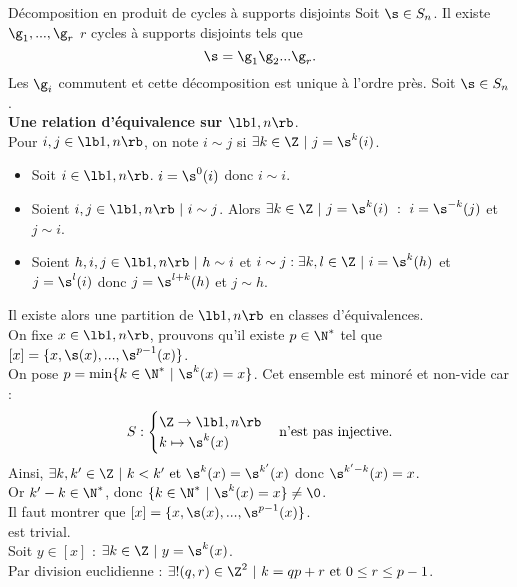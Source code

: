\documentclass[11pt]{article}
\begin{document}
\begin{thm}{Décomposition en produit de cycles à supports disjoints}{}
    Soit $\s\in S_n$. Il existe $\g_1,...,\g_r$ $r$ cycles à supports disjoints tels que
    \begin{equation*}
        \s=\g_1\g_2...\g_r.
    \end{equation*}
    Les $\g_i$ commutent et cette décomposition est unique à l'ordre près.
    \tcblower
    Soit $\s\in S_n$.\\
    \textbf{Une relation d'équivalence sur $\lb1,n\rb$}.\\
    Pour $i,j\in\lb1,n\rb$, on note $i\sim j$ si $\exists k \in \Z ~ | ~ j = \s^k(i)$.
    \begin{itemize}
        \item Soit $i\in\lb1,n\rb$. $i=\s^0(i)$ donc $i \sim i$.
        \item Soient $i,j\in\lb1,n\rb ~ | ~ i \sim j$. Alors $\exists k \in \Z ~ | ~ j = \s^k(i) ~ : ~ i = \s^{-k}(j)$ et $j \sim i$.
        \item Soient $h,i,j\in\lb1,n\rb ~ | ~ h \sim i$ et $i \sim j : \exists k,l \in \Z ~ | ~ i = \s^k(h)$ et $j=\s^l(i)$ donc $j=\s^{l+k}(h)$ et $j \sim h$.
    \end{itemize}
    Il existe alors une partition de $\lb1,n\rb$ en classes d'équivalences.\\
    On fixe $x\in\lb1,n\rb$, prouvons qu'il existe $p\in\N^*$ tel que $[x]=\{x,\s(x),...,\s^{p-1}(x)\}$.\\
    On pose $p=\min\{k\in\N^* ~ | ~ \s^k(x)=x\}$. Cet ensemble est minoré et non-vide car :
    \begin{equation*}
        S : \begin{cases}
            \Z \to \lb1,n\rb\\
            k\mapsto \s^k(x)
        \end{cases}
        \text{n'est pas injective.}
    \end{equation*}
    Ainsi, $\exists k,k' \in \Z ~ | ~ k < k' ~ \text{et} ~ \s^k(x)=\s^{k'}(x)$ donc $\s^{k'-k}(x)=x$.\\
    Or $k'-k\in\N^*$, donc $\{k\in\N^* ~ | ~ \s^k(x)=x\}\neq\0$.\\
    Il faut montrer que $[x]=\{x,\s(x),...,\s^{p-1}(x)\}$.\\
    \fbox{$\supset$} est trivial.\\
    \fbox{$\subset$} Soit $y\in[x]$ : $\exists k \in \Z ~ | ~ y = \s^k(x)$.\\
    Par division euclidienne : $\exists!(q,r)\in\Z^2 ~ | ~ k = qp + r ~ \text{et} ~ 0 \leq r \leq p-1$.\\

\end{thm}
\end{document}
